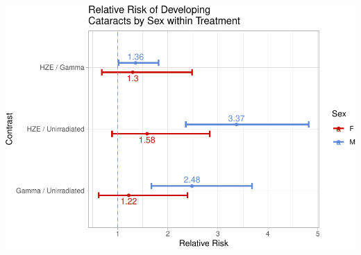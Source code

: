 \documentclass[
]{article}
\begin{document}
\includegraphics{final_report_files/figure-latex/RR-1.pdf}
\end{document}
